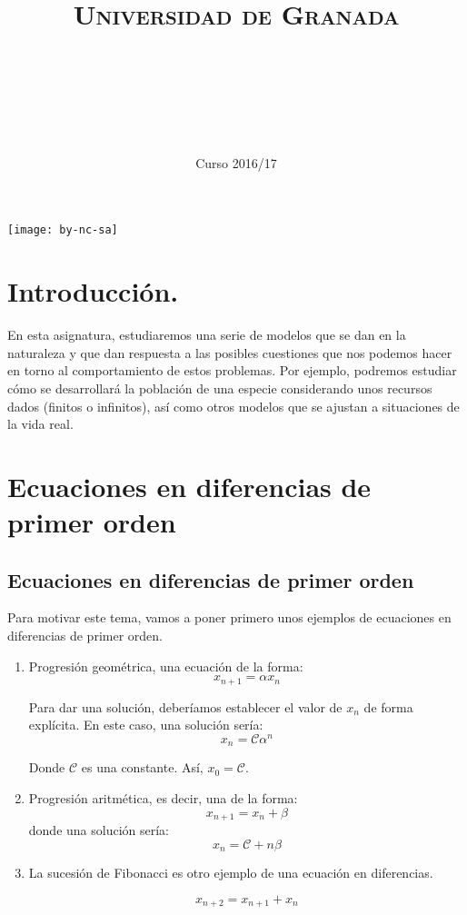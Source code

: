 \documentclass[11pt, a4paper, titlepage]{article}
\title{
  \normalfont \normalsize 
  \textsc{Universidad de Granada} \\ [25pt]    %
  \horrule{0.5pt} \\[0.4cm] %
  \huge \subject\\ %
  \horrule{2pt} \\[0.5cm] %
}
\author{\Large{\docauthor}}
\date{\vspace{-1.5em} \normalsize Curso 2016/17}
\theoremstyle{theorem-style}
\theoremstyle{definition-style}
\theoremstyle{remark-style}
\theoremstyle{example-style}
\begin{document}
\maketitle  %
\tableofcontents    %
\vfill
\begin{center}
\texttt{[image: by-nc-sa]}  %
\end{center}
\newpage


\section*{Introducción.}
En esta asignatura, estudiaremos una serie de modelos que se dan en la naturaleza y que dan respuesta a las posibles cuestiones que nos podemos hacer en torno al comportamiento de estos problemas. Por ejemplo, podremos estudiar cómo se desarrollará la población de una especie considerando unos recursos dados (finitos o infinitos), así como otros modelos que se ajustan a situaciones de la vida real.



\newpage
\section{Ecuaciones en diferencias de primer orden}
\subsection{Ecuaciones en diferencias de primer orden}

Para motivar este tema, vamos a poner primero unos ejemplos de ecuaciones en diferencias de primer orden.

\begin{enumerate}
	\item Progresión geométrica, una ecuación de la forma:
\[
x_{n+1} =  \alpha x_n
\]

Para dar una solución, deberíamos establecer el valor de $x_n$ de forma explícita. En este caso, una solución sería:
\[
x_n = \mathcal{C} \alpha^n
\]

Donde $\mathcal{C}$ es una constante. Así, $x_0 = \mathcal{C}$.

\item Progresión aritmética, es decir, una de la forma:
\[
x_{n+1} = x_n + \beta
\]
donde una solución sería:
\[
x_n = \mathcal{C} + n\beta
\]

\item La sucesión de Fibonacci es otro ejemplo de una ecuación en diferencias.

\[
x_{n+2} = x_{n+1} + x_{n}
\]

\end{enumerate}
\end{document}

